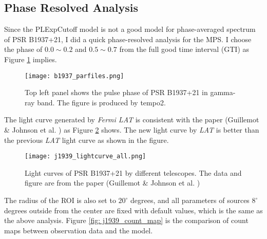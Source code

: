 \documentclass[12pt]{report}
\begin{document}
    \subsection{Phase Resolved Analysis}
      Since the PLExpCutoff model is not a good model for phase-averaged spectrum of 
      PSR B1937+21, I did a quick phase-resolved analysis for the MPS. I choose the 
      phase of $0.0 \sim 0.2$ and $0.5 \sim 0.7$ from the full good time interval (GTI) as 
      Figure \ref{fig: j1939_phase} implies. 
      \begin{figure}[!htp]
        \centering 
        \texttt{[image: b1937\_parfiles.png]}
        \caption{Top left panel shows the pulse phase of PSR B1937+21 in gamma-ray band. 
          The figure is produced by tempo2.}
        \label{fig: j1939_phase}
      \end{figure}

      The light curve generated by \textit{Fermi LAT} is consistent with the paper 
      (Guillemot \& Johnson et al. \cite{J1939_old}) as Figure \ref{fig: j1939_light_curve_compare} shows. 
      The new light curve by \textit{LAT} is better than the previous \textit{LAT} light curve
      as shown in the figure. 

      \begin{figure}
        \centering 
        \texttt{[image: j1939\_lightcurve\_all.png]}
        \caption{Light curves of PSR B1937+21 by different telescopes. The data and figure
          are from the paper (Guillemot \& Johnson et al. \cite{J1939_old})}
        \label{fig: j1939_light_curve_compare}
      \end{figure}


      The radius of the ROI is also set to $20^{\circ}$ degrees, and all parameters of 
      sources $8^{\circ}$ degrees outside from the center are fixed with default values, 
      which is the same as the above analysis. 
      Figure \ref{fig: j1939_count_map} is the comparison of count maps between 
      observation data and the model.
\end{document}
